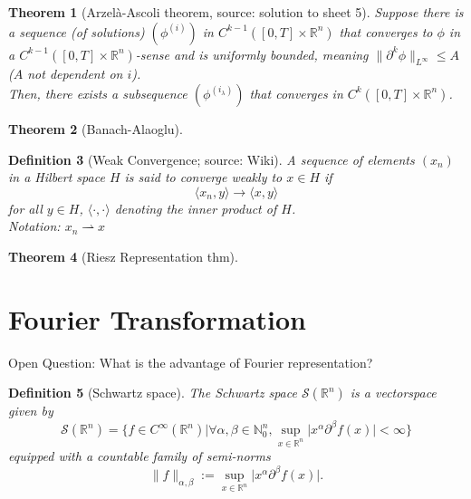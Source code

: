\documentclass[12pt,a4paper]{article}
\newtheorem{definition}{Definition}
\newtheorem{thm}[definition]{Theorem}
\begin{document}
\begin{thm}[Arzelà-Ascoli theorem, source: solution to sheet 5]
Suppose there is a sequence (of solutions) $(\phi^{(i)})$ in $C^{k-1}([0,T]\times \mathbb{R}^n)$ that converges to $\phi$ in a $C^{k-1}([0,T]\times \mathbb{R}^n)$-sense and is uniformly bounded, meaning $\lVert \partial ^k \phi \rVert _{L^{\infty}} \leq A$ ($A$ not dependent on $i$).\\
Then, there exists a subsequence $(\phi^{(i_{\lambda})})$ that converges in $C^{k}([0,T]\times \mathbb{R}^n)$.
\end{thm}

\begin{thm}[Banach-Alaoglu]
\end{thm}

\begin{definition}[Weak Convergence; source: Wiki]
A sequence of elements $(x_n)$ in a Hilbert space $H$ is said to converge weakly to $x\in H$ if
\begin{equation}
\langle x_n, y \rangle \rightarrow \langle x, y \rangle
\end{equation}
for all $y\in H$, $\langle \cdot , \cdot \rangle$ denoting the inner product of $H$. \\
Notation: $x_n \rightharpoonup x$
\end{definition}

\begin{thm}[Riesz Representation thm]
\end{thm}

\section{Fourier Transformation}

Open Question: What is the advantage of Fourier representation?

\begin{definition}[Schwartz space]
The Schwartz space $\mathcal{S}(\mathbb{R}^n)$ is a vectorspace given by
\begin{equation}
\mathcal{S}(\mathbb{R}^n)=\{f\in C^{\infty}(\mathbb{R}^n)\lvert \forall \alpha,\beta\in \mathbb{N}^n_0, \sup_{x\in\mathbb{R}^n}\lvert x^{\alpha}\partial^{\beta}f(x)\rvert <\infty\}
\end{equation}
equipped with a countable family of semi-norms
\begin{equation}
\lVert f \rVert_{\alpha,\beta} := \sup_{x\in\mathbb{R}^n}\lvert x^{\alpha}\partial^{\beta}f(x)\rvert.
\end{equation}
\end{definition}
\end{document}
